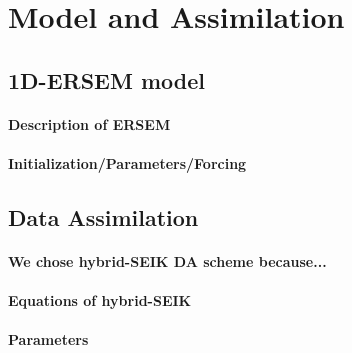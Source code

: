 \section{Model and Assimilation}

\subsection{1D-ERSEM model}

\paragraph{Description of ERSEM}

\paragraph{Initialization/Parameters/Forcing}

\subsection{Data Assimilation}

\paragraph{We chose hybrid-SEIK DA scheme because...}

\paragraph{Equations of hybrid-SEIK}

\paragraph{Parameters}
